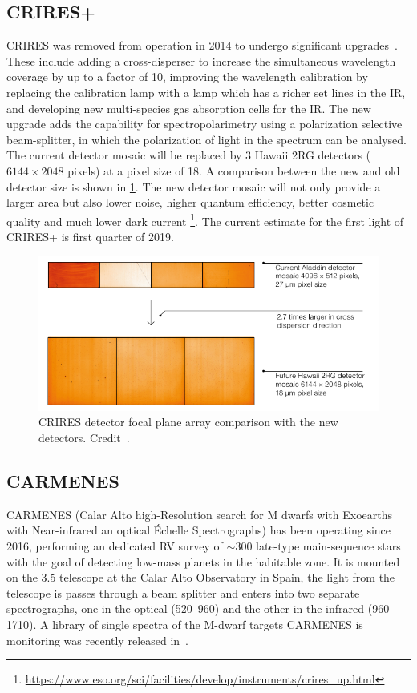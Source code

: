 \subsection{CRIRES+}
\label{subsec:criresplus}
CRIRES was removed from operation in 2014 to undergo significant upgrades~\citep{dorn_crires_2014}.
These include adding a cross-disperser to increase the simultaneous wavelength coverage by up to a factor of 10, improving the wavelength calibration by replacing the \thar{} calibration lamp with a \une{} lamp which has a richer set lines in the IR, and developing new multi-species gas absorption cells for the {IR}.
The new upgrade adds the capability for spectropolarimetry using a polarization selective beam-splitter, in which the polarization of light in the spectrum can be analysed.
The current detector mosaic will be replaced by 3 Hawaii 2RG detectors (\(6144\times 2048\) pixels) at a pixel size of 18\um{}.
A comparison between the new and old detector size is shown in \cref{fig:criresplus_detecotrs}.
The new detector mosaic will not only provide a larger area but also lower noise, higher quantum efficiency, better cosmetic quality and much lower dark current
\footnote{\href{https://www.eso.org/sci/facilities/develop/instruments/crires_up.html}{https://www.eso.org/sci/facilities/develop/instruments/crires\_up.html}}.
The current estimate for the first light of CRIRES+ is first quarter of 2019.

\begin{figure}
    \centering
    \includegraphics[width=0.5\linewidth]{figures/spectroscopy/criresplus_detectors.pdf}
    \caption{CRIRES detector focal plane array comparison with the new detectors.
    Credit~\citet{dorn_crires_2014}.}
    \label{fig:criresplus_detecotrs}
\end{figure}

\subsection{CARMENES}
\label{subsec:carmenes}
{CARMENES} (Calar Alto high-Resolution search for M dwarfs with Exoearths with Near-infrared an optical \'Echelle Spectrographs) has been operating since 2016, performing an dedicated RV survey of \(\sim300\) late-type main-sequence stars with the goal of detecting low-mass planets in the habitable zone.
It is mounted on the 3.5\m{} telescope at the Calar Alto Observatory in Spain, the light from the telescope is passes through a beam splitter and enters into two separate spectrographs, one in the optical (520--960\nm{}) and the other in the infrared (960--1710\nm{}).
A library of single spectra of the {M-dwarf} targets CARMENES is monitoring was recently released in~\citep{reiners_carmenes_2018}.

